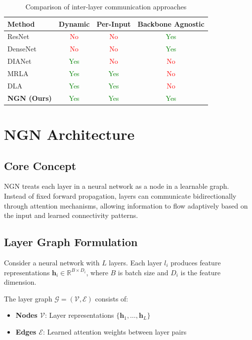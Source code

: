 \documentclass[11pt]{article}
\begin{document}
\begin{table}[H]
\centering
\caption{Comparison of inter-layer communication approaches}
\label{tab:communication_methods}
\begin{tabular}{@{}lccc@{}}
\toprule
Method & Dynamic & Per-Input & Backbone Agnostic \\
\midrule
ResNet \cite{he2016deep} & \textcolor{red}{No} & \textcolor{red}{No} & \textcolor{green}{Yes} \\
DenseNet \cite{huang2017densely} & \textcolor{red}{No} & \textcolor{red}{No} & \textcolor{green}{Yes} \\
DIANet \cite{chen2018dynamic} & \textcolor{green}{Yes} & \textcolor{red}{No} & \textcolor{red}{No} \\
MRLA \cite{liu2020multi} & \textcolor{green}{Yes} & \textcolor{green}{Yes} & \textcolor{red}{No} \\
DLA \cite{liu2020dynamic} & \textcolor{green}{Yes} & \textcolor{green}{Yes} & \textcolor{red}{No} \\
\textbf{NGN (Ours)} & \textcolor{green}{Yes} & \textcolor{green}{Yes} & \textcolor{green}{Yes} \\
\bottomrule
\end{tabular}
\end{table}

\section{NGN Architecture}

\subsection{Core Concept}

NGN treats each layer in a neural network as a node in a learnable graph. Instead of fixed forward propagation, layers can communicate bidirectionally through attention mechanisms, allowing information to flow adaptively based on the input and learned connectivity patterns.

\subsection{Layer Graph Formulation}

Consider a neural network with $L$ layers. Each layer $l_i$ produces feature representations $\mathbf{h}_i \in \mathbb{R}^{B \times D_i}$, where $B$ is batch size and $D_i$ is the feature dimension.

The layer graph $\mathcal{G} = (\mathcal{V}, \mathcal{E})$ consists of:
\begin{itemize}
    \item \textbf{Nodes $\mathcal{V}$}: Layer representations $\{\mathbf{h}_1, \dots, \mathbf{h}_L\}$
    \item \textbf{Edges $\mathcal{E}$}: Learned attention weights between layer pairs
\end{itemize}
\end{document}

